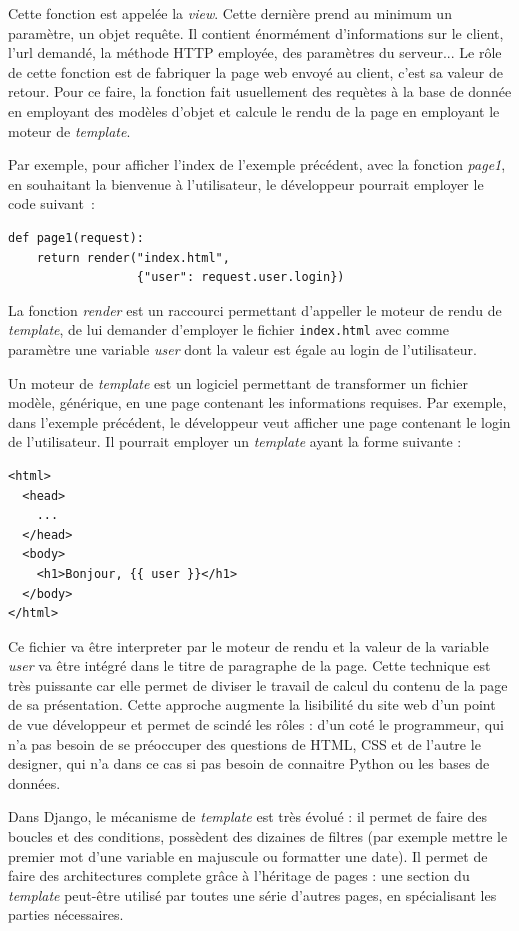 \documentclass[a4paper,12pt]{article}
\begin{document}
Cette fonction est appelée la \textit{view}. Cette dernière prend au minimum un paramètre,
un objet requête. Il contient énormément d'informations sur le client, l'url demandé,
la méthode HTTP employée, des paramètres du serveur... Le rôle de cette fonction
est de fabriquer la page web envoyé au client, c'est sa valeur de retour. Pour ce faire,
la fonction fait usuellement des requètes à la base de donnée en employant des modèles
d'objet et calcule le rendu de la page en employant le moteur de \textit{template}.

Par exemple, pour afficher l'index de l'exemple précédent, avec la fonction \textit{page1},
en souhaitant la bienvenue à l'utilisateur, le développeur pourrait employer le code
suivant~:

\begin{verbatim}
def page1(request):
    return render("index.html",
                  {"user": request.user.login})
\end{verbatim}

La fonction \textit{render} est un raccourci permettant d'appeller le moteur
de rendu de \textit{template}, de lui demander d'employer le fichier \texttt{index.html}
avec comme paramètre une variable \textit{user} dont la valeur est égale
au login de l'utilisateur.

Un moteur de \textit{template} est un logiciel permettant de transformer un fichier
modèle, générique, en une page contenant les informations requises. Par exemple,
dans l'exemple précédent, le développeur veut afficher une page contenant le
login de l'utilisateur. Il pourrait employer un \textit{template} ayant
la forme suivante : 

\begin{verbatim}
<html>
  <head>
    ...
  </head>
  <body>
    <h1>Bonjour, {{ user }}</h1>
  </body>
</html>
\end{verbatim}

Ce fichier va être interpreter par le moteur de rendu et la valeur de la variable
\textit{user} va être intégré dans le titre de paragraphe de la page. Cette
technique est très puissante car elle permet de diviser le travail de calcul
du contenu de la page de sa présentation. Cette approche augmente la lisibilité
du site web d'un point de vue développeur et permet de scindé les rôles : d'un
coté le programmeur, qui n'a pas besoin de se préoccuper des questions
de HTML, CSS et de l'autre le designer, qui n'a dans ce cas si pas
besoin de connaitre Python ou les bases de données.

Dans Django, le mécanisme de \textit{template} est très évolué : il permet
de faire des boucles et des conditions, possèdent des dizaines de filtres (par
exemple mettre le premier mot d'une variable en majuscule ou formatter une date).
Il permet de faire des architectures complete grâce à l'héritage de pages :
une section du \textit{template} peut-être utilisé par toutes une série d'autres
pages, en spécialisant les parties nécessaires.
\end{document}
